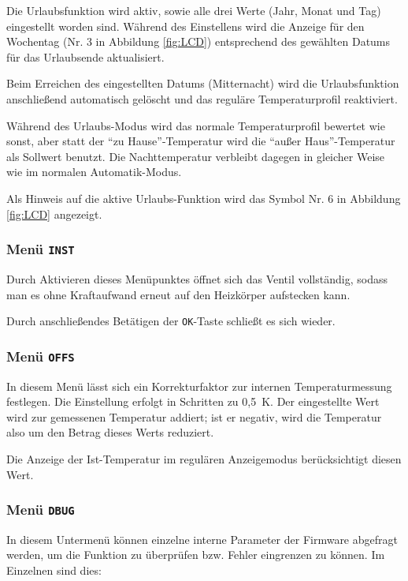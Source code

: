 \documentclass[a5paper,twoside]{article}
\begin{document}
Die Urlaubsfunktion wird aktiv, sowie alle drei Werte (Jahr, Monat
und Tag) eingestellt worden sind.  Während des Einstellens wird
die Anzeige für den Wochentag (Nr. 3 in Abbildung \ref{fig:LCD}) entsprechend
des gewählten Datums für das Urlaubsende aktualisiert.

Beim Erreichen des eingestellten Datums (Mitternacht) wird die
Urlaubsfunktion anschließend automatisch gelöscht und das reguläre
Temperaturprofil reaktiviert.

Während des Urlaubs-Modus wird das normale Temperaturprofil bewertet
wie sonst, aber statt der "`zu Hause"'-Temperatur wird die "`außer
Haus"'-Temperatur als Sollwert benutzt.  Die Nachttemperatur
verbleibt dagegen in gleicher Weise wie im normalen Automatik-Modus.

Als Hinweis auf die aktive Urlaubs-Funktion wird das Symbol Nr. 6
in Abbildung \ref{fig:LCD} angezeigt.

\subsubsection {
  Menü \texttt{INST}
}

Durch Aktivieren dieses Menüpunktes öffnet sich das Ventil
vollständig, sodass man es ohne Kraftaufwand erneut auf
den Heizkörper aufstecken kann.

Durch anschließendes Betätigen der \texttt{OK}-Taste schließt
es sich wieder.

\subsubsection {
  Menü \texttt{OFFS}
}

In diesem Menü lässt sich ein Korrekturfaktor zur internen
Temperaturmessung festlegen.  Die Einstellung erfolgt in Schritten zu
0,5~K.  Der eingestellte Wert wird zur gemessenen Temperatur addiert;
ist er negativ, wird die Temperatur also um den Betrag dieses Werts
reduziert.

Die Anzeige der Ist-Temperatur im regulären Anzeigemodus
berücksichtigt diesen Wert.

\subsubsection {
  Menü \texttt{DBUG}
}

In diesem Untermenü können einzelne interne Parameter der Firmware
abgefragt werden, um die Funktion zu überprüfen bzw. Fehler eingrenzen
zu können.  Im Einzelnen sind dies:
\end{document}
